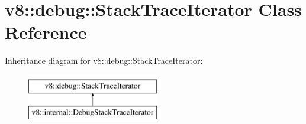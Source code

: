 \hypertarget{classv8_1_1debug_1_1StackTraceIterator}{}\section{v8\+:\+:debug\+:\+:Stack\+Trace\+Iterator Class Reference}
\label{classv8_1_1debug_1_1StackTraceIterator}
Inheritance diagram for v8\+:\+:debug\+:\+:Stack\+Trace\+Iterator\+:\begin{figure}[H]
\begin{center}
\leavevmode
\includegraphics[height=2.000000cm]{classv8_1_1debug_1_1StackTraceIterator}
\end{center}
\end{figure}
